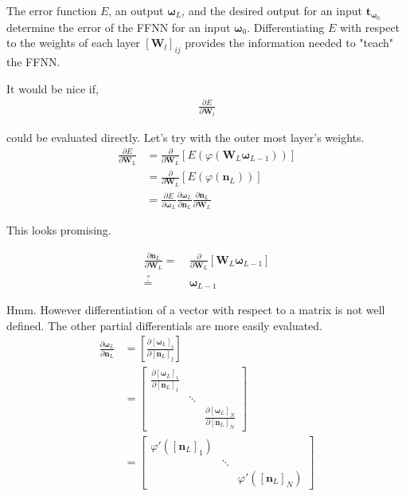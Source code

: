 \documentclass[12pt,letterpaper]{article}
\begin{document}
The error function $E$, an output $\boldsymbol{\omega}_L$, and the desired output for an input $\boldsymbol{t}_{\boldsymbol{\omega}_0}$  determine the error of the FFNN for an input $\boldsymbol{\omega}_0$.  Differentiating $E$ with respect to the weights of each layer $\left[\textbf{W}_l\right]_{ij}$ provides the information needed to "teach" the FFNN.

It would be nice if,
\begin{align}
\frac{\partial E}{\partial \boldsymbol{W}_l}
\end{align}

could be evaluated directly. Let's try with the outer most layer's weights.
\begin{align}
\frac{\partial E}{\partial \boldsymbol{W}_L} 
&= 
\frac{\partial}{\partial \boldsymbol{W}_L}\left[E( \varphi(\boldsymbol{W}_{L} \boldsymbol{\omega}_{L-1}))\right] \\
&=
\frac{\partial}{\partial \boldsymbol{W}_L}\left[E( \varphi(\boldsymbol{n}_L))\right] \\
&=
\frac{\partial E}{\partial \boldsymbol{\omega}_{L}} 
\frac{\partial \boldsymbol{\omega}_{L}}{\partial \boldsymbol{n}_L}
\frac{\partial \boldsymbol{n}_L}{\partial \boldsymbol{W}_L}
\end{align}

This looks promising.  

\begin{align}
\frac{\partial \boldsymbol{n}_L}{\partial \boldsymbol{W}_L} =&\ 
\frac{\partial}{\partial \boldsymbol{W}_L} \left[ \boldsymbol{W}_{L} \boldsymbol{\omega}_{L-1} \right] \\
\stackrel{?}{=}&\ \boldsymbol{\omega}_{L-1}
\end{align}

Hmm.  However differentiation of a vector with respect to a matrix is not well defined.  The other partial differentials are more easily evaluated.
\begin{align}
\frac{\partial \boldsymbol{\omega}_{L}}{\partial \boldsymbol{n}_L} 
&=
\left[ \frac{\partial \left[ \boldsymbol{\omega}_{L} \right]_i}{\partial \left[ \boldsymbol{n}_L\right]_j} \right] \\
&=
\begin{bmatrix}
\frac{\partial \left[ \boldsymbol{\omega}_{L} \right]_1}{\partial \left[ \boldsymbol{n}_L\right]_1} &\\ 
& \ddots &\\ 
& & \frac{\partial \left[ \boldsymbol{\omega}_{L} \right]_N}{\partial \left[ \boldsymbol{n}_L\right]_N}
\end{bmatrix} \\
&=
\begin{bmatrix}
\varphi'(\left[\boldsymbol{n}_L\right]_1) & \\ 
& \ddots &\\ 
& & \varphi'(\left[\boldsymbol{n}_L\right]_N)
\end{bmatrix}
\end{align}
\end{document}
